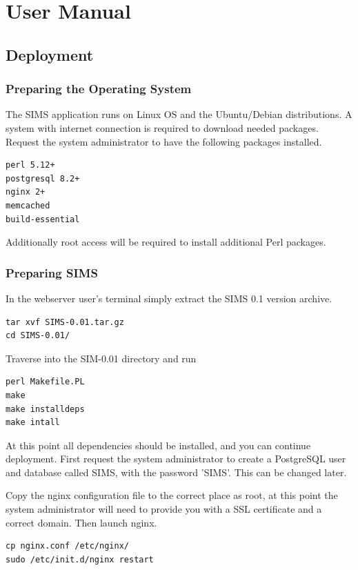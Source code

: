 \documentclass{journal}
\begin{document}
\newpage

\section{User Manual}

\subsection{Deployment}

\subsubsection{Preparing the Operating System}

The SIMS application runs on Linux OS and the Ubuntu/Debian distributions. A system with internet connection is required to download needed packages. Request the system administrator to 
have the following packages installed. 

\begin{verbatim}
perl 5.12+
postgresql 8.2+
nginx 2+
memcached 
build-essential
\end{verbatim}

Additionally root access will be required to install additional Perl packages.

\subsubsection{Preparing SIMS}

In the webserver user's terminal simply extract the SIMS 0.1 version archive.
\begin{verbatim}
tar xvf SIMS-0.01.tar.gz
cd SIMS-0.01/
\end{verbatim}

Traverse into the SIM-0.01 directory and run
\begin{verbatim}
perl Makefile.PL
make 
make installdeps
make intall
\end{verbatim}

At this point all dependencies should be installed, and you can continue deployment. 
First request the system administrator to create a PostgreSQL user and database called SIMS, with the password 'SIMS'. This can be changed later.

Copy the nginx configuration file to the correct place as root, at this point the system administrator will need to provide you with a SSL certificate and a correct domain. Then launch nginx.
\begin{verbatim}
cp nginx.conf /etc/nginx/
sudo /etc/init.d/nginx restart
\end{verbatim}
\end{document}
